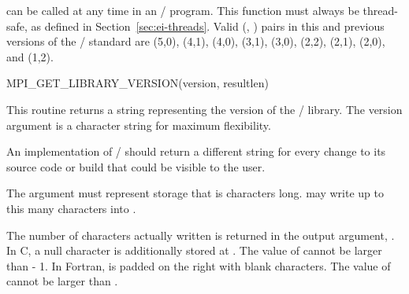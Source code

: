  can be called
at any time in an \MPI/ program.
This function must always be thread-safe, as defined in
Section~\ref{sec:ei-threads}.
Valid (, ) pairs in
this and previous versions of the \MPI/ standard
are (5,0), (4,1), (4,0), (3,1), (3,0), (2,2), (2,1), (2,0), and (1,2).

\begin{funcdef}{MPI\_GET\_LIBRARY\_VERSION}{(\mbox{version}, \mbox{resultlen})}
\end{funcdef}

This routine returns a string representing the version of the \MPI/ library. The version argument is a 
character string for maximum flexibility.

\begin{implementors}
An implementation of \MPI/ should return a different 
string for every change to its source code or build that could be visible 
to the user.
\end{implementors}

The argument  must represent storage that is\flushline %
 characters 
long.  may write up 
to this many characters into .

The number of characters actually written is returned in the 
output argument, . In C, a null character is 
additionally stored at . The value of 
 cannot be larger than 
 - 1. In 
Fortran,  is padded on the right with blank characters. 
The value of  cannot be larger than 
. 

